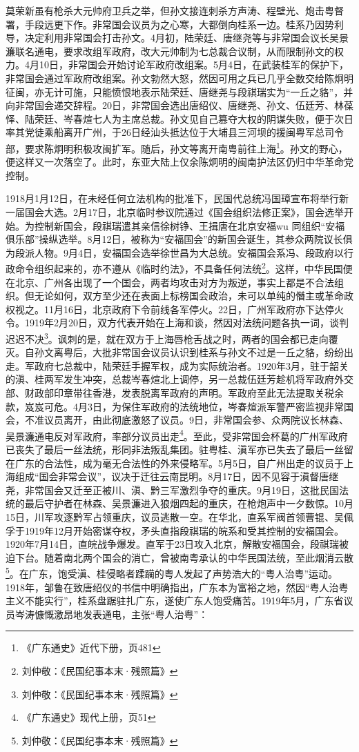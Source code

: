 莫荣新虽有枪杀大元帅府卫兵之举，但孙文接连刺杀方声涛、程壁光、炮击粤督署，手段远更下作。非常国会议员为之心寒，大都倒向桂系一边。桂系乃因势利导，决定利用非常国会打击孙文。4月初，陆荣廷、唐继尧等与非常国会议长吴景濂联名通电，要求改组军政府，改大元帅制为七总裁合议制，从而限制孙文的权力。4月10日，非常国会开始讨论军政府改组案。5月4日，在武装桂军的保护下，非常国会通过军政府改组案。孙文勃然大怒，然因可用之兵已几乎全数交给陈炯明征闽，亦无计可施，只能愤恨地表示陆荣廷、唐继尧与段祺瑞实为“一丘之貉”，并向非常国会递交辞程。20日，非常国会选出唐绍仪、唐继尧、孙文、伍廷芳、林葆怿、陆荣廷、岑春煊七人为主席总裁。孙文见自己篡夺大权的阴谋失败，便于次日率其党徒乘船离开广州，于26日经汕头抵达位于大埔县三河坝的援闽粤军总司令部，要求陈炯明积极攻闽扩军。随后，孙文等离开南粤前往上海\footnote{《广东通史》近代下册，页481}。孙文的野心，便这样又一次落空了。此时，东亚大陆上仅余陈炯明的闽南护法区仍归中华革命党控制。

1918月1月12日，在未经任何立法机构的批准下，民国代总统冯国璋宣布将举行新一届国会大选。2月17日，北京临时参议院通过《国会组织法修正案》，国会选举开始。为控制新国会，段祺瑞遣其亲信徐树铮、王揖唐在北京安福wu 同组织“安福俱乐部”操纵选举。8月12日，被称为“安福国会”的新国会诞生，其参众两院议长俱为段派人物。9月4日，安福国会选举徐世昌为大总统。安福国会系冯、段政府以行政命令组织起来的，亦不遵从《临时约法》，不具备任何法统\footnote{刘仲敬：《民国纪事本末·残照篇》}。这样，中华民国便在北京、广州各出现了一个国会，两者均攻击对方为叛逆，事实上都是不合法组织。但无论如何，双方至少还在表面上标榜国会政治，未可以单纯的僭主或革命政权视之。11月16日，北京政府下令前线各军停火。22日，广州军政府亦下达停火令。1919年2月20日，双方代表开始在上海和谈，然因对法统问题各执一词，谈判迟迟不决\footnote{刘仲敬：《民国纪事本末·残照篇》}。讽刺的是，就在双方于上海唇枪舌战之时，两者的国会都已走向覆灭。自孙文离粤后，大批非常国会议员认识到桂系与孙文不过是一丘之貉，纷纷出走。军政府七总裁中，陆荣廷手握军权，成为实际统治者。1920年3月，驻于韶关的滇、桂两军发生冲突，总裁岑春煊北上调停，另一总裁伍廷芳趁机将军政府外交部、财政部印章带往香港，发表脱离军政府的声明。军政府至此无法提取关税余款，岌岌可危。4月3日，为保住军政府的法统地位，岑春煊派军警严密监视非常国会，不准议员离开，由此彻底激怒了议员。9日，非常国会参、众两院议长林森、吴景濂通电反对军政府，率部分议员出走\footnote{《广东通史》现代上册，页51}。至此，受非常国会杯葛的广州军政府已丧失了最后一丝法统，形同非法叛乱集团。驻粤桂、滇军亦已失去了最后一丝留在广东的合法性，成为毫无合法性的外来侵略军。5月5日，自广州出走的议员于上海组成“国会非常会议”，议决于迁往云南昆明。8月17日，因不见容于滇督唐继尧，非常国会又迁至正被川、滇、黔三军激烈争夺的重庆。9月19日，这批民国法统的最后守护者在林森、吴景濂进入狼烟四起的重庆，在枪炮声中一夕数惊。10月15日，川军攻逐黔军占领重庆，议员逃散一空。在华北，直系军阀首领曹锟、吴佩孚于1919年12月开始密谋夺权，矛头直指段祺瑞的皖系和受其控制的安福国会。1920年7月14日，直皖战争爆发。直军于23日攻入北京，解散安福国会，段祺瑞被迫下台。随着南北两个国会的消亡，曾被南粤承认的中华民国法统，至此烟消云散\footnote{刘仲敬：《民国纪事本末·残照篇》}。在广东，饱受滇、桂侵略者蹂躏的粤人发起了声势浩大的“粤人治粤”运动。1918年，邹鲁在致唐绍仪的书信中明确指出，广东本为富裕之地，然因“粤人治粤主义不能实行”，桂系盘踞驻扎广东，遂使广东人饱受痛苦。1919年5月，广东省议员岑涛慷慨激昂地发表通电，主张“粤人治粤”：

